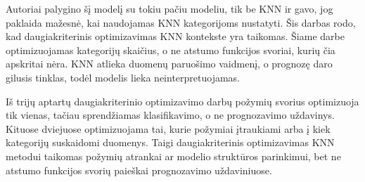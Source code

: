 \documentclass[]{VUMIFTemplateClass}
\begin{document}
    Autoriai palygino šį modelį su tokiu pačiu modeliu, tik be KNN ir gavo, jog paklaida mažesnė, kai naudojamas KNN kategorijoms nustatyti.
    Šis darbas rodo, kad daugiakriterinis optimizavimas KNN kontekste yra taikomas.
    Šiame darbe optimizuojamas kategorijų skaičius, o ne atstumo funkcijos svoriai, kurių čia apskritai nėra.
    KNN atlieka duomenų paruošimo vaidmenį, o prognozę daro gilusis tinklas, todėl modelis lieka neinterpretuojamas.

    Iš trijų aptartų daugiakriterinio optimizavimo darbų požymių svorius optimizuoja tik vienas, tačiau sprendžiamas klasifikavimo, o ne prognozavimo uždavinys.
    Kituose dviejuose optimizuojama tai, kurie požymiai įtraukiami arba į kiek kategorijų suskaidomi duomenys.
    Taigi daugiakriterinis optimizavimas KNN metodui taikomas požymių atrankai ar modelio struktūros parinkimui, bet ne atstumo funkcijos svorių paieškai prognozavimo uždaviniuose.


    

\end{document}
